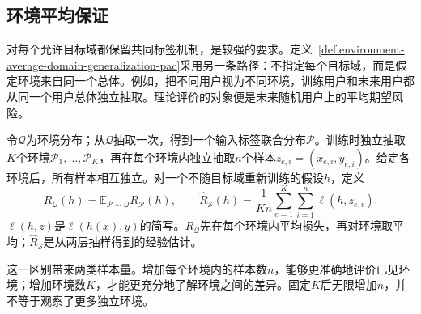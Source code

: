 \subsection{环境平均保证}
\label{sec:dg-random-environments}

对每个允许目标域都保留共同标签机制，是较强的要求。定义~\ref{def:environment-average-domain-generalization-pac}采用另一条路径：不指定每个目标域，而是假定环境来自同一个总体。例如，把不同用户视为不同环境，训练用户和未来用户都从同一个用户总体独立抽取。理论评价的对象便是未来随机用户上的平均期望风险。

令$\mathcal Q$为环境分布；从$\mathcal Q$抽取一次，得到一个输入标签联合分布$\mathcal P$。训练时独立抽取$K$个环境$\mathcal P_1,\ldots,\mathcal P_K$，再在每个环境内独立抽取$n$个样本$z_{e,i}=(x_{e,i},y_{e,i})$。给定各环境后，所有样本相互独立。对一个不随目标域重新训练的假设$h$，定义
\begin{equation}
 R_{\mathcal Q}(h)=\mathbb E_{\mathcal P\sim\mathcal Q}R_{\mathcal P}(h),
 \qquad
 \widehat R_{\mathcal S}(h)=\frac1{Kn}\sum_{e=1}^{K}\sum_{i=1}^{n}\ell(h,z_{e,i}).
 \label{eq:environment-average-risk}
\end{equation}
$\ell(h,z)$是$\ell(h(x),y)$的简写。$R_{\mathcal Q}$先在每个环境内平均损失，再对环境取平均；$\widehat R_{\mathcal S}$是从两层抽样得到的经验估计。

这一区别带来两类样本量。增加每个环境内的样本数$n$，能够更准确地评价已见环境；增加环境数$K$，才能更充分地了解环境之间的差异。固定$K$后无限增加$n$，并不等于观察了更多独立环境。

